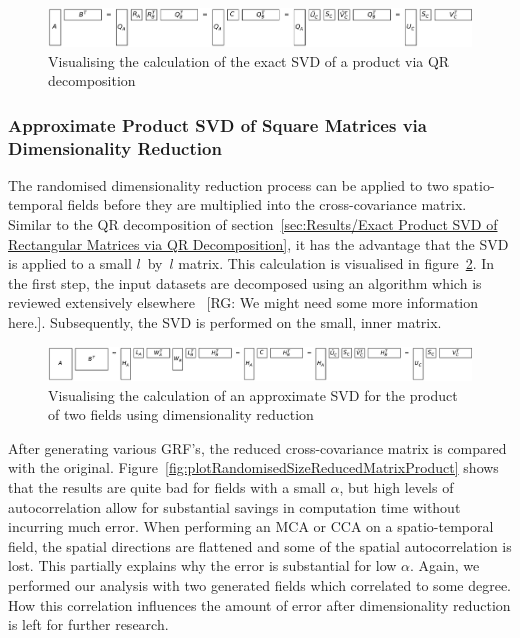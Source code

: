 \documentclass[ijgi,article,submit,moreauthors,pdftex,10pt,a4paper]{Definitions/mdpi}
\begin{document}
\begin{figure}[H]
\centering
\includegraphics[width=\textwidth]{Results/qrProductSVD.pdf}
\caption[Exact SVD via QR decomposition]{Visualising the calculation of the exact SVD of a product via QR decomposition}
\label{fig:qrProductSVD}
\end{figure}

\subsubsection{Approximate Product SVD of Square Matrices via Dimensionality Reduction}
\label{sec:Results/Approximate Product SVD of Square Matrices via Dimensionality Reduction}
The randomised dimensionality reduction process can be applied to two spatio-temporal fields before they are multiplied into the cross-covariance matrix. Similar to the QR decomposition of section~\ref{sec:Results/Exact Product SVD of Rectangular Matrices via QR Decomposition}, it has the advantage that the SVD is applied to a small $l$~by~$l$ matrix. This calculation is visualised in figure~\ref{fig:randomisedSquareProductSVD}. In the first step, the input datasets are decomposed using an algorithm which is reviewed extensively elsewhere~\cite{Halko2011, Li2016} [RG: We might need some more information here.]. Subsequently, the SVD is performed on the small, inner matrix.

\begin{figure}[H]
\centering
\includegraphics[width=\textwidth]{Results/randomisedSquareProductSVD.pdf}
\caption[Approximate product SVD]{Visualising the calculation of an approximate SVD for the product of two fields using dimensionality reduction}
\label{fig:randomisedSquareProductSVD}
\end{figure}

After generating various GRF's, the reduced cross-covariance matrix is compared with the original. Figure~\ref{fig:plotRandomisedSizeReducedMatrixProduct} shows that the results are quite bad for fields with a small $\alpha$, but high levels of autocorrelation allow for substantial savings in computation time without incurring much error. When performing an MCA or CCA on a spatio-temporal field, the spatial directions are flattened and some of the spatial autocorrelation is lost. This partially explains why the error is substantial for low $\alpha$. Again, we performed our analysis with two generated fields which correlated to some degree. How this correlation influences the amount of error after dimensionality reduction is left for further research.
\end{document}
